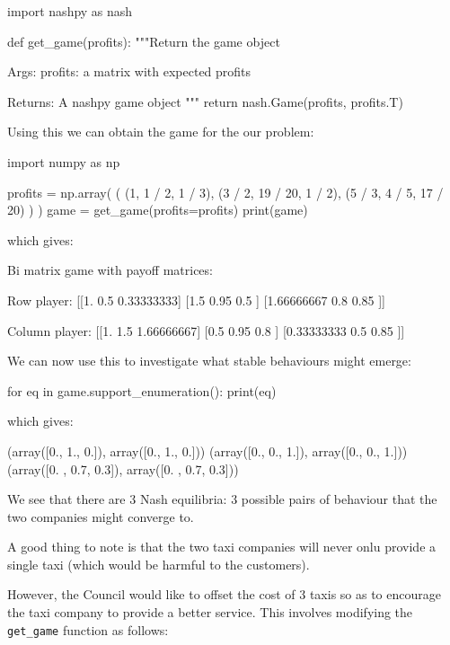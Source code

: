 \begin{pyin}
import nashpy as nash


def get_game(profits):
    """Return the game object

    Args:
        profits: a matrix with expected profits

    Returns:
        A nashpy game object
    """
    return nash.Game(profits, profits.T)
\end{pyin}

Using this we can obtain the game for the our problem:

\begin{pyin}
import numpy as np

profits = np.array(
    (
        (1, 1 / 2, 1 / 3),
        (3 / 2, 19 / 20, 1 / 2),
        (5 / 3, 4 / 5, 17 / 20)
    )
)
game = get_game(profits=profits)
print(game)
\end{pyin}

which gives:

\begin{pyout}
Bi matrix game with payoff matrices:

Row player:
[[1.         0.5        0.33333333]
 [1.5        0.95       0.5       ]
 [1.66666667 0.8        0.85      ]]

Column player:
[[1.         1.5        1.66666667]
 [0.5        0.95       0.8       ]
 [0.33333333 0.5        0.85      ]]
\end{pyout}

We can now use this to investigate what stable behaviours might emerge:

\begin{pyin}
for eq in game.support_enumeration():
    print(eq)
\end{pyin}

which gives:

\begin{pyout}
(array([0., 1., 0.]), array([0., 1., 0.]))
(array([0., 0., 1.]), array([0., 0., 1.]))
(array([0. , 0.7, 0.3]), array([0. , 0.7, 0.3]))
\end{pyout}

We see that there are 3 Nash equilibria: 3 possible pairs of behaviour that the
two companies might converge to.

A good thing to note is that the two taxi
companies will never onlu provide a single taxi (which would be harmful to the
customers).

However, the Council would like to offset the cost of 3
taxis so as to encourage the taxi company to provide a better service. This
involves modifying the \texttt{get_game} function as follows:


